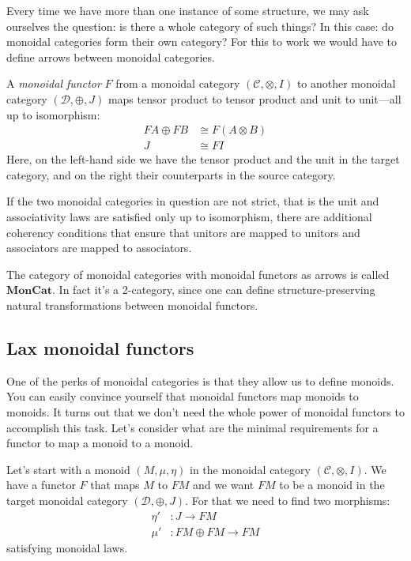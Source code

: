 \documentclass[DaoFP]{subfiles}
\begin{document}
Every time we have more than one instance of some structure, we may ask ourselves the question: is there a whole category of such things? In this case: do monoidal categories form their own category? For this to work we would have to define arrows between monoidal categories.

A \emph{monoidal functor} $F$ from a monoidal category $(\mathcal{C}, \otimes, I)$ to another monoidal category $(\mathcal{D}, \oplus, J)$ maps tensor product to tensor product and unit to unit---all up to isomorphism:
\begin{align*}
F A \oplus F B &\cong F (A \otimes B) \\
J &\cong F I 
\end{align*}
Here, on the left-hand side we have the tensor product and the unit in the target category, and on the right their counterparts in the source category. 

If the two monoidal categories in question are not strict, that is the unit and associativity laws are satisfied only up to isomorphism, there are additional coherency conditions that ensure that unitors are mapped to unitors and associators are mapped to associators.

The category of monoidal categories with monoidal functors as arrows is called $\mathbf{MonCat}$. In fact it's a 2-category, since one can define structure-preserving natural transformations between monoidal functors.

\subsection{Lax monoidal functors}

One of the perks of monoidal categories is that they allow us to define monoids. You can easily convince yourself that monoidal functors map monoids to monoids. It turns out that we don't need the whole power of monoidal functors to accomplish this task. Let's consider what are the minimal requirements for a functor to map a monoid to a monoid. 

Let's start with a monoid $(M, \mu, \eta)$ in the monoidal category $(\mathcal{C}, \otimes, I)$. We have a functor $F$ that maps $M$ to $F M$ and we want $F M$ to be a monoid in the target monoidal category $(\mathcal{D}, \oplus, J)$. For that we need to find two morphisms:
\begin{align*}
\eta' &\colon J \to F M \\
 \mu' &\colon F M \oplus F M \to F M 
\end{align*}
satisfying monoidal laws.
\end{document}
